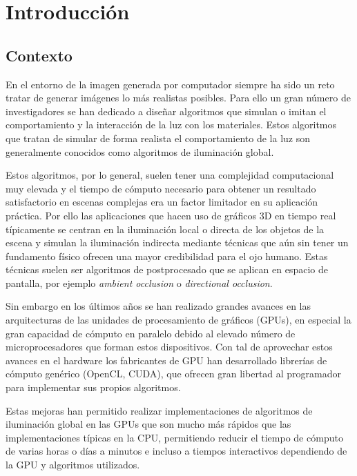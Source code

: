 \chapter{Introducción}

\section{Contexto}

En el entorno de la imagen generada por computador siempre ha sido un reto tratar de generar imágenes lo más realistas posibles. Para ello un gran número de investigadores se han dedicado a diseñar algoritmos que simulan o imitan el comportamiento y la interacción de la luz con los materiales. Estos algoritmos que tratan de simular de forma realista el comportamiento de la luz son generalmente conocidos como algoritmos de iluminación global.

\medskip

Estos algoritmos, por lo general, suelen tener una complejidad computacional muy elevada y el tiempo de cómputo necesario para obtener un resultado satisfactorio en escenas complejas era un factor limitador en su aplicación práctica. Por ello las aplicaciones que hacen uso de gráficos 3D en tiempo real típicamente se centran en la iluminación local o directa de los objetos de la escena y simulan la iluminación indirecta mediante técnicas que aún sin tener un fundamento físico ofrecen una mayor credibilidad para el ojo humano. Estas técnicas suelen ser algoritmos de postprocesado que se aplican en espacio de pantalla, por ejemplo \emph{ambient occlusion} o \emph{directional occlusion}. 

\medskip

Sin embargo en los últimos años se han realizado grandes avances en las arquitecturas de las unidades de procesamiento de gráficos (GPUs), en especial la gran capacidad de cómputo en paralelo debido al elevado número de microprocesadores que forman estos dispositivos. Con tal de aprovechar estos avances en el hardware los fabricantes de GPU han desarrollado librerías de cómputo genérico (OpenCL, CUDA), que ofrecen gran libertad al programador para implementar sus propios algoritmos.

\medskip

Estas mejoras han permitido realizar implementaciones de algoritmos de iluminación global en las GPUs que son mucho más rápidos que las implementaciones típicas en la CPU, permitiendo reducir el tiempo de cómputo de varias horas o días a minutos e incluso a tiempos interactivos dependiendo de la GPU y algoritmos utilizados.

